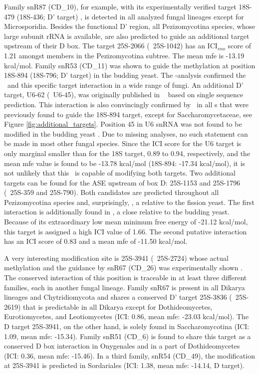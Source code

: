 Family snR87 (CD\_10), for example, with its experimentally verified target
18S-479 (18S-436; D' target) , is detected in all
analyzed fungal lineages except for Microsporidia. Besides the functional
D' region, all Pezizomycotina species, whose large subunit rRNA is
available, are also predicted to guide an additional target upstream of
their D box. The target 25S-2066 (\ncr\ 25S-1042) has an ICI$_{sno}$ score
of 1.21 amongst members in the Pezizomycotina subtree. The mean mfe is
-13.19 kcal/mol.  Family snR53 (CD\_11) was shown to guide the methylation
at position 18S-894 (18S-796; D' target) in the budding yeast. The
\snostrip-analysis confirmed the \sno\ and this specific target interaction
in a wide range of fungi. An additional D' target, U6-62 (\sce\ U6-45), was
originally published in \ncr\ \cite{Liu:2009} based on single sequence
prediction. This interaction is also convincingly confirmed by \snostrip\
in all \sno s that were previously found to guide the 18S-894 target,
except for Saccharomycetaceae, see Figure
\ref{fig:additional_targets}. Position 45 in U6 snRNA was not found to be
modified in the budding yeast \cite{Machnicka:2013, Massenet:1998}. Due to
missing analyses, no such statement can be made in most other fungal
species. Since the ICI score for the U6 target is only marginal smaller
than for the 18S target, 0.89 to 0.94, respectively, and the mean mfe value
is found to be -13.78 kcal/mol (18S-894: -17.34 kcal/mol), it is not unlikely
that this \sno\ is capable of modifying both targets. Two
additional targets can be found for the ASE upstream of box D: 25S-1153 and
25S-1796 (\ncr\ 25S-359 and 25S-790). Both candidates are predicted
throughout all Pezizomycotina species and, surprisingly, \Tde, a relative
to the fission yeast. The first interaction is additionally found in \Yli,
a close relative to the budding yeast. Because of its extraordinary low
mean minimum free energy of -21.12 kcal/mol, this target is assigned a high
ICI value of 1.66. The second putative interaction has an ICI score of 0.83
and a mean mfe of -11.50 kcal/mol.

A very interesting modification site is 25S-3941 (\sce\ 25S-2724)
whose actual methylation and the guidance by snR67 (CD\_26) was
experimentally shown \cite{Lowe:1999}. The conserved interaction of
this position is traceable in at least three different families, each
in another fungal lineage. Family snR67 is present in all Dikarya
lineages and Chytridiomycota and shares a conserved D' target 25S-3836
(\sce\ 25S-2619) that is predictable in all Dikarya except for
Dothideomycetes, Eurotiomycetes, and Leotiomycetes (ICI: 0.86, mean
mfe: -23.03 kcal/mol). The D target 25S-3941, on the other hand, is
solely found in Saccharomycotina (ICI: 1.09, mean mfe: -15.34). Family
snR51 (CD\_6) is found to share this target as a conserved D box
interaction in Onygenales and in a part of Dothideomycetes (ICI: 0.36,
mean mfe: -15.46). In a third family, snR54 (CD\_49), the modification
at 25S-3941 is predicted in Sordariales (ICI: 1.38, mean mfe: -14.14,
D target).

